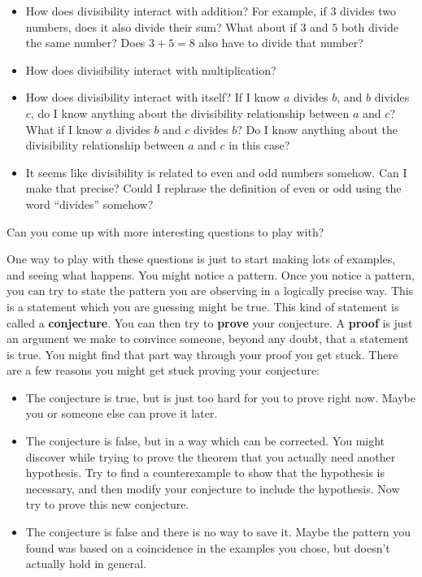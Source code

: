 \begin{itemize}
	\item How does divisibility interact with addition?  For example, if $3$ divides two numbers, does it also divide their sum?  What about if $3$ and $5$ both divide the same number?  Does $3+5 = 8$ also have to divide that number?
	\item How does divisibility interact with multiplication?
	\item How does divisibility interact with itself?  If I know $a$ divides $b$, and $b$ divides $c$, do I know anything about the divisibility relationship between $a$ and $c$?  What if I know $a$ divides $b$ and $c$ divides $b$?  Do I know anything about the divisibility relationship between $a$ and $c$ in this case?
	\item It seems like divisibility is related to even and odd numbers somehow.  Can I make that precise?  Could I rephrase the definition of even or odd using the word ``divides'' somehow?
\end{itemize}

Can you come up with more interesting questions to play with?

One way to play with these questions is just to start making lots of examples, and seeing what happens.  You might notice a pattern.  Once you notice a pattern, you can try to state the pattern you are observing in a logically precise way.  This is a statement which you are guessing might be true.  This kind of statement is called a \textbf{conjecture}.  You can then try to  \textbf{prove} your conjecture.  A \textbf{proof} is just an argument we make to convince someone, beyond any doubt, that a statement is true.  You might find that part way through your proof you get stuck.  There are a few reasons you might get stuck proving your conjecture:

\begin{itemize}
	\item The conjecture is true, but is just too hard for you to prove right now.  Maybe you or someone else can prove it later.
	\item The conjecture is false, but in a way which can be corrected.  You might discover while trying to prove the theorem that you actually need another hypothesis.  Try to find a counterexample to show that the hypothesis is necessary, and then modify your conjecture to include the hypothesis.  Now try to prove this new conjecture.
	\item The conjecture is false and there is no way to save it.  Maybe the pattern you found was based on a coincidence in the examples you chose, but doesn't actually hold in general.
\end{itemize}

